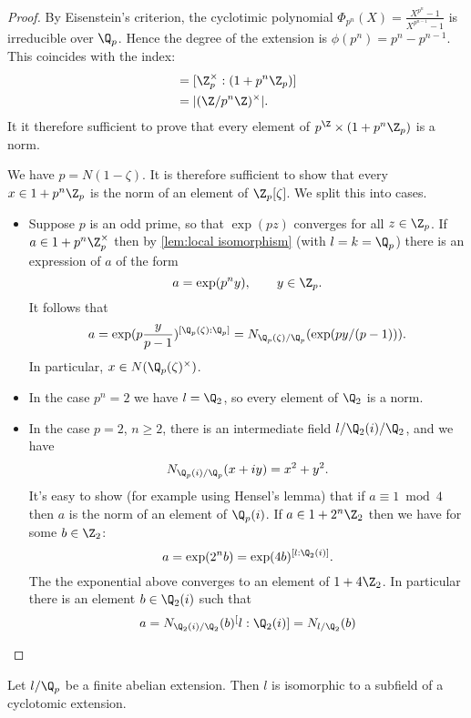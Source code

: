 \begin{proof}
	By Eisenstein's criterion, the cyclotimic polynomial
	$\Phi_{p^n}(X) = \frac{X^{p^n}-1}{X^{p^{n-1}}-1}$ is irreducible over $\Q_p$.
	Hence the degree of the extension is $\phi(p^n)=p^n - p^{n-1}$.
	This coincides with the index:
	\begin{align*}
		[\Q_p^\times : p^\Z \times (1+p^n \Z_p)]
		&= [\Z_p^\times : (1+p^n \Z_p)] \\
		&= | (\Z / p^n \Z)^\times |.
	\end{align*}
	It it therefore sufficient to prove that every element of $p^\Z \times (1+p^n \Z_p)$
	is a norm.

	We have $p = N(1-\zeta)$.
	It is therefore sufficient to show that every $x \in 1 + p^n \Z_p$
	is the norm of an element of $\Z_p[\zeta]$. We split this into cases.
	\begin{itemize}
		\item
		Suppose $p$ is an odd prime, so that $\exp(pz)$ converges for all $z\in \Z_p$.
		If $a \in 1 +p^n\Z_p^\times$ then by \ref{lem:local isomorphism} (with $l=k=\Q_p$)
		there is an expression of $a$ of the form
		\[
			a = \exp(p^n y), \qquad y \in \Z_p.
		\]
		It follows that
		\[
			a= \exp(p\frac{y}{p-1}) ^{[\Q_p(\zeta):\Q_p]}
			= N_{\Q_p(\zeta)/\Q_p}(\exp(py/(p-1))).
		\]
		In particular, $x\in N(\Q_p(\zeta)^\times)$.
		\item
		In the case $p^n = 2$ we have $l = \Q_2$, so every element of $\Q_2$ is a norm.
		\item
		In the case $p=2$, $n \ge 2$, there is an intermediate field $l / \Q_2(i) / \Q_2$,
		and we have
		\[
			N_{\Q_p(i) / \Q_p} (x+i y) = x^2 + y^2.
		\]
		It's easy to show (for example using Hensel's lemma) that if $a \equiv 1 \bmod 4$
		then $a$ is the norm of an element of $\Q_p(i)$.
		If $a \in 1 + 2^n \Z_2$ then we have for some $b \in \Z_2$:
		\[
			a = \exp(2^n b) = \exp(4b)^{[l:\Q_2(i)]}.
		\]
		The the exponential above converges to an element of $1+4\Z_2$.
		In particular there is an element $b \in \Q_2(i)$ such that
		\[
			a = N_{\Q_2(i)/\Q_2} (b) ^ [l:\Q_2(i)]
			= N_{l/\Q_2} (b)
		\]
	\end{itemize}
\end{proof}

\begin{theorem} \label{thm:local Kronecker Weber}
	Let $l/\Q_p$ be a finite abelian extension.
	Then $l$ is isomorphic to a subfield of a cyclotomic extension.
\end{theorem}

